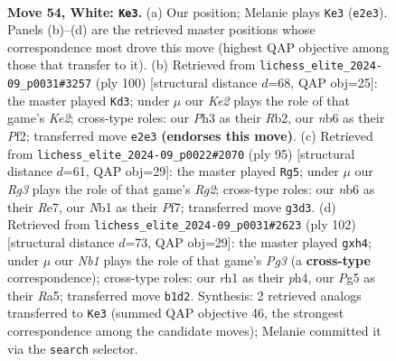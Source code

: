 \documentclass[11pt]{article}
\begin{document}
\clearpage

\begin{figure}[p]\centering
\begin{subfigure}{0.46\textwidth}\centering
\resizebox{\linewidth}{!}{%
\newchessgame
\chessboard[
  setfen={6k1/5p1p/1n4p1/p3p1P1/P3P3/1P4RP/4K1P1/RN1r3r w - - 22 54},
  showmover=false,
  pgfstyle=straightmove, color=movearrow, markmove={e2-e3}
]}
\caption{}
\end{subfigure}\hfill
\begin{subfigure}{0.46\textwidth}\centering
\resizebox{\linewidth}{!}{%
\newchessgame
\chessboard[
  setfen={8/2r1bk1p/1p2p1p1/1P2p3/2r4P/2N1P1P1/1RR1KP2/8 w - - 1 51},
  showmover=false,
  pgfstyle=straightmove, color=movearrow, markmove={e2-d3}
]}
\caption{}
\end{subfigure}
\\[4pt]
\begin{subfigure}{0.46\textwidth}\centering
\resizebox{\linewidth}{!}{%
\newchessgame
\chessboard[
  setfen={8/4rpr1/p2Np2k/P1p1nR1P/4P1p1/1PP5/2K3R1/8 b - - 1 48},
  showmover=false,
  pgfstyle=straightmove, color=movearrow, markmove={g7-g5}
]}
\caption{}
\end{subfigure}\hfill
\begin{subfigure}{0.46\textwidth}\centering
\resizebox{\linewidth}{!}{%
\newchessgame
\chessboard[
  setfen={1k6/1r6/1P2r1p1/R1P2p2/P2P1P1p/1R4PK/8/8 w - - 0 52},
  showmover=false,
  pgfstyle=straightmove, color=movearrow, markmove={g3-h4}
]}
\caption{}
\end{subfigure}
\caption{\textbf{Move 54, White: \texttt{Ke3}.} (a) Our position; Melanie plays \texttt{Ke3} (\texttt{e2e3}). Panels (b)--(d) are the retrieved master positions whose correspondence most drove this move (highest QAP objective among those that transfer to it). (b) Retrieved from \texttt{lichess\_elite\_2024-09\_p0031\#3257} (ply 100) [structural distance $d$=68, QAP obj=25]: the master played \texttt{Kd3}; under $\mu$ our \emph{Ke2} plays the role of that game's \emph{Ke2}; cross-type roles: our \emph{P}h3 as their \emph{R}b2, our \emph{n}b6 as their \emph{P}f2; transferred move \texttt{e2e3} \textbf{(endorses this move)}. (c) Retrieved from \texttt{lichess\_elite\_2024-09\_p0022\#2070} (ply 95) [structural distance $d$=61, QAP obj=29]: the master played \texttt{Rg5}; under $\mu$ our \emph{Rg3} plays the role of that game's \emph{Rg2}; cross-type roles: our \emph{n}b6 as their \emph{R}e7, our \emph{N}b1 as their \emph{P}f7; transferred move \texttt{g3d3}. (d) Retrieved from \texttt{lichess\_elite\_2024-09\_p0031\#2623} (ply 102) [structural distance $d$=73, QAP obj=29]: the master played \texttt{gxh4}; under $\mu$ our \emph{Nb1} plays the role of that game's \emph{Pg3} (a \textbf{cross-type} correspondence); cross-type roles: our \emph{r}h1 as their \emph{p}h4, our \emph{P}g5 as their \emph{R}a5; transferred move \texttt{b1d2}. Synthesis: 2 retrieved analogs transferred to \texttt{Ke3} (summed QAP objective 46, the strongest correspondence among the candidate moves); Melanie committed it via the \texttt{search} selector.}
\label{fig:thought-m106}
\end{figure}
\end{document}
